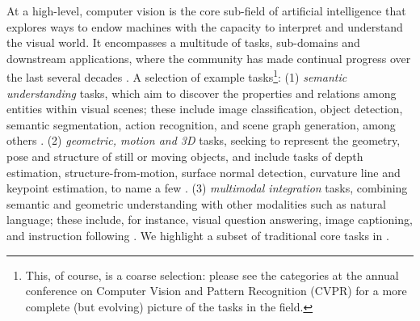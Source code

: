 At a high-level, computer vision is the core sub-field of artificial intelligence that explores ways to endow machines with the capacity to interpret and understand the visual world. It encompasses a multitude of tasks, sub-domains and downstream applications, where the community has made continual progress over the last several decades \cite{zamir2018taskonomy}. A selection of example tasks\footnote{This, of course, is a coarse selection: please see the categories at the annual conference on Computer Vision and Pattern Recognition (CVPR) for a more complete (but evolving) picture of the tasks in the field.}:
(1) \textit{semantic understanding} tasks, which aim to discover the properties and relations among entities within visual scenes; these include image classification, object detection, semantic segmentation, action recognition, and scene graph generation, among others \citep[\eg][]{krizhevsky2012imagenet, he2016deep,  krishna2017visual, russakovsky2015imagenet, krizhevsky2009learning, kay2017kinetics, lin2014microsoft}. (2) \textit{geometric, motion and 3D} tasks, seeking to represent the geometry, pose and structure of still or moving objects, and include tasks of depth estimation, structure-from-motion, surface normal detection, curvature line and keypoint estimation, to name a few \citep[\eg][]{laina2016deeper, agarwal2011building, wang2015designing, zamir2018taskonomy, ullman1979interpretation}.
(3) \textit{multimodal integration} tasks, combining semantic and geometric understanding with other modalities such as natural language; these include, for instance, visual question answering, image captioning, and instruction following \citep[\eg][]{antol2015vqa, chen2015microsoft, anderson2018vision, goyal2017making, hudson2019gqa, johnson2017clevr, luo2020univl, akbari2021vatt, huang2021seeing, tsimpoukelli2021multimodal}. 
We highlight a subset of traditional core tasks in .

